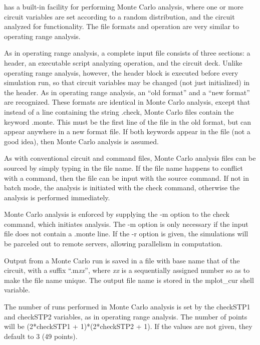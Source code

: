 {\WRspice} has a built-in facility for performing Monte Carlo
analysis, where one or more circuit variables are set according to
a random distribution, and the circuit analyzed for functionality. 
The file formats and operation are very similar to operating range
analysis.

As in operating range analysis, a complete input file consists of
three sections: a header, an executable script analyzing operation,
and the circuit deck.  Unlike operating range analysis, however, the
header block is executed before every simulation run, so that circuit
variables may be changed (not just initialized) in the header.  As in
operating range analysis, an ``old format'' and a ``new format'' are
recognized.  These formats are identical in Monte Carlo analysis,
except that instead of a line containing the string {\vt .check}, Monte
Carlo files contain the keyword {\vt .monte}.  This must be the first
line of the file in the old format, but can appear anywhere in a new
format file.  If both keywords appear in the file (not a good idea),
then Monte Carlo analysis is assumed.

As with conventional circuit and command files, Monte Carlo analysis
files can be sourced by simply typing in the file name.  If the file
name happens to conflict with a command, then the file can be input
with the {\cb source} command.  If not in batch mode, the analysis is
initiated with the {\cb check} command, otherwise the analysis is
performed immediately.

Monte Carlo analysis is enforced by supplying the {\vt -m} option to
the {\cb check} command, which initiates analysis.  The {\vt -m}
option is only necessary if the input file does not contain a {\vt
.monte} line.  If the {\vt -r} option is given, the simulations will
be parceled out to remote servers, allowing parallelism in
computation.

Output from a Monte Carlo run is saved in a file with base name that
of the circuit, with a suffix ``{\vt .m}{\it xx}'', where {\it xx} is
a sequentially assigned number so as to make the file name unique. 
The output file name is stored in the {\et mplot\_cur} shell variable.

The number of runs performed in Monte Carlo analysis is set by the
{\et checkSTP1} and {\et checkSTP2} variables, as in operating range
analysis.  The number of points will be {\vt (2*checkSTP1 +
1)*(2*checkSTP2 + 1)}.  If the values are not given, they default to 3
(49 points).

